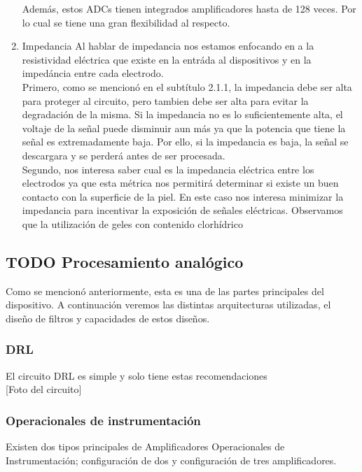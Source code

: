 \begin{enumerate}
Además, estos ADCs tienen integrados amplificadores hasta de 128 veces. Por lo cual se tiene una gran flexibilidad al respecto.\\

\item Impedancia
\label{sec:org5a464a5}
Al hablar de impedancia nos estamos enfocando en a la resistividad eléctrica que existe en la entráda al dispositivos y en la impedáncia entre cada electrodo.\\

Primero, como se mencionó en el subtítulo 2.1.1, la impedancia debe ser alta para proteger al circuito, pero tambien debe ser alta para evitar la degradación de la misma. Si la impedancia no es lo suficientemente alta, el voltaje de la señal puede disminuir aun más ya que la potencia que tiene la señal es extremadamente baja. Por ello, si la impedancia es baja, la señal se descargara y se perderá antes de ser procesada.\\

Segundo, nos interesa saber cual es la impedancia eléctrica entre los electrodos ya que esta métrica nos permitirá determinar si existe un buen contacto con la superficie de la piel. En este caso nos interesa minimizar la impedancia para incentivar la exposición de señales eléctricas. Observamos que la utilización de geles con contenido clorhídrico\\
\end{enumerate}

\subsection{{\bfseries\sffamily TODO} Procesamiento analógico}
\label{sec:org224d442}
Como se mencionó anteriormente, esta es una de las partes principales del dispositivo. A continuación veremos las distintas arquitecturas utilizadas, el diseño de filtros y capacidades de estos diseños.\\

\subsubsection{DRL}
\label{sec:orgf223522}
El circuito DRL es simple y solo tiene estas recomendaciones\\

[Foto del circuito]\\

\subsubsection{Operacionales de instrumentación}
\label{sec:orga9f661c}
Existen dos tipos principales de Amplificadores Operacionales de Instrumentación; configuración de dos y configuración de tres amplificadores.\\

